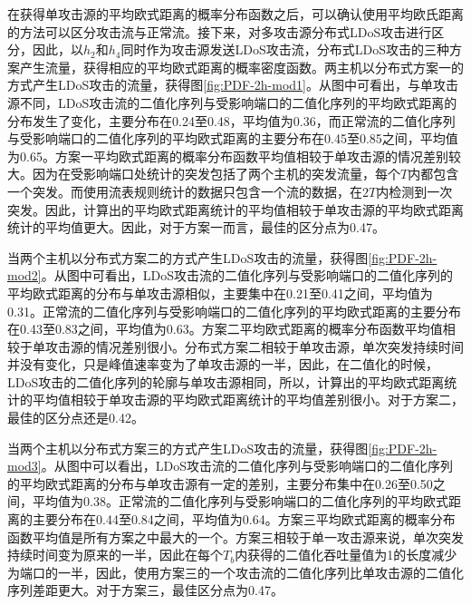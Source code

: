 
在获得单攻击源的平均欧式距离的概率分布函数之后，可以确认使用平均欧氏距离的方法可以区分攻击流与正常流。接下来，对多攻击源分布式LDoS攻击进行区分，因此，以$h_2$和$h_4$同时作为攻击源发送LDoS攻击流，分布式LDoS攻击的三种方案产生流量，获得相应的平均欧式距离的概率密度函数。两主机以分布式方案一的方式产生LDoS攻击的流量，获得图\ref{fig:PDF-2h-mod1}。从图中可看出，与单攻击源不同，LDoS攻击流的二值化序列与受影响端口的二值化序列的平均欧式距离的分布发生了变化，主要分布在0.24至0.48，平均值为0.36，而正常流的二值化序列与受影响端口的二值化序列的平均欧式距离的主要分布在0.45至0.85之间，平均值为0.65。方案一平均欧式距离的概率分布函数平均值相较于单攻击源的情况差别较大。因为在受影响端口处统计的突发包括了两个主机的突发流量，每个$T$内都包含一个突发。而使用流表规则统计的数据只包含一个流的数据，在$2T$内检测到一次突发。因此，计算出的平均欧式距离统计的平均值相较于单攻击源的平均欧式距离统计的平均值更大。因此，对于方案一而言，最佳的区分点为0.47。

当两个主机以分布式方案二的方式产生LDoS攻击的流量，获得图\ref{fig:PDF-2h-mod2}。从图中可看出，LDoS攻击流的二值化序列与受影响端口的二值化序列的平均欧式距离的分布与单攻击源相似，主要集中在0.21至0.41之间，平均值为0.31。正常流的二值化序列与受影响端口的二值化序列的平均欧式距离的主要分布在0.43至0.83之间，平均值为0.63。方案二平均欧式距离的概率分布函数平均值相较于单攻击源的情况差别很小。分布式方案二相较于单攻击源，单次突发持续时间并没有变化，只是峰值速率变为了单攻击源的一半，因此，在二值化的时候，LDoS攻击的二值化序列的轮廓与单攻击源相同，所以，计算出的平均欧式距离统计的平均值相较于单攻击源的平均欧式距离统计的平均值差别很小。对于方案二，最佳的区分点还是0.42。

当两个主机以分布式方案三的方式产生LDoS攻击的流量，获得图\ref{fig:PDF-2h-mod3}。从图中可以看出，LDoS攻击流的二值化序列与受影响端口的二值化序列的平均欧式距离的分布与单攻击源有一定的差别，主要分布集中在0.26至0.50之间，平均值为0.38。正常流的二值化序列与受影响端口的二值化序列的平均欧式距离的主要分布在0.44至0.84之间，平均值为0.64。方案三平均欧式距离的概率分布函数平均值是所有方案之中最大的一个。方案三相较于单一攻击源来说，单次突发持续时间变为原来的一半，因此在每个$T_b$内获得的二值化吞吐量值为1的长度减少为端口的一半，因此，使用方案三的一个攻击流的二值化序列比单攻击源的二值化序列差距更大。对于方案三，最佳区分点为0.47。

